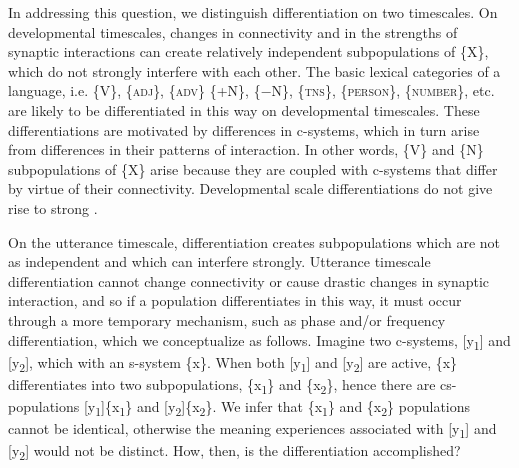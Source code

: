   In addressing this question, we distinguish differentiation on two timescales. On developmental timescales, changes in connectivity and in the strengths of synaptic interactions can create relatively independent subpopulations of \{X\}, which do not strongly interfere with each other. The basic lexical categories of a language, i.e. \{V\}, \{\textsc{adj}\}, \{\textsc{adv}\} \{+N\}, \{−N\}, \{\textsc{tns}\}, \{\textsc{person}\}, \{\textsc{number}\}, etc. are likely to be differentiated in this way on developmental timescales. These differentiations are motivated by differences in c-systems, which in turn arise from differences in their patterns of  interaction. In other words, \{V\} and \{N\} subpopulations of \{X\} arise because they are coupled with c-systems that differ by virtue of their  connectivity. Developmental scale differentiations do not give rise to strong .

  On the utterance timescale, differentiation creates subpopulations which are not as independent and which can interfere strongly. Utterance timescale differentiation cannot change connectivity or cause drastic changes in synaptic interaction, and so if a population differentiates in this way, it must occur through a more temporary mechanism, such as phase and/or frequency differentiation, which we conceptualize as follows. Imagine two c-systems, [y\textsubscript{1}] and [y\textsubscript{2}], which  with an s-system \{x\}. When both [y\textsubscript{1}] and [y\textsubscript{2}] are active, \{x\} differentiates into two subpopulations, \{x\textsubscript{1}\} and \{x\textsubscript{2}\}, hence there are cs-populations [y\textsubscript{1}]\{x\textsubscript{1}\} and [y\textsubscript{2}]\{x\textsubscript{2}\}. We infer that \{x\textsubscript{1}\} and \{x\textsubscript{2}\} populations cannot be identical, otherwise the meaning experiences associated with [y\textsubscript{1}] and [y\textsubscript{2}] would not be distinct. How, then, is the differentiation accomplished? 

